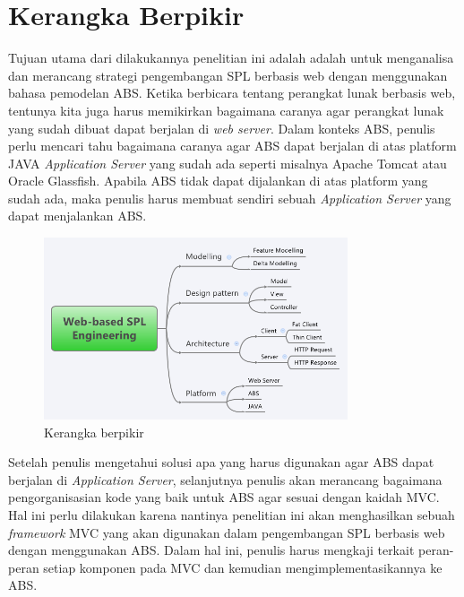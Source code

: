 \section{Kerangka Berpikir}
\noindent
Tujuan utama dari dilakukannya penelitian ini adalah adalah untuk menganalisa dan merancang strategi pengembangan SPL berbasis web dengan menggunakan bahasa pemodelan ABS. Ketika berbicara tentang perangkat lunak berbasis web, tentunya kita juga harus memikirkan bagaimana caranya agar perangkat lunak yang sudah dibuat dapat berjalan di \textit{web server}. Dalam konteks ABS, penulis perlu mencari tahu bagaimana caranya agar ABS dapat berjalan di atas platform JAVA \textit{Application Server} yang sudah ada seperti misalnya Apache Tomcat atau Oracle Glassfish. Apabila ABS tidak dapat dijalankan di atas platform yang sudah ada, maka penulis harus membuat sendiri sebuah \textit{Application Server} yang dapat menjalankan ABS.

\begin{figure}
    \centering
    \includegraphics[width=0.8\textwidth]
        {img/kerangka-berpikir.png}
    \caption{Kerangka berpikir}
\end{figure}

\noindent
Setelah penulis mengetahui solusi apa yang harus digunakan agar ABS dapat berjalan di \textit{Application Server}, selanjutnya penulis akan merancang bagaimana pengorganisasian kode yang baik untuk ABS agar sesuai dengan kaidah MVC. Hal ini perlu dilakukan karena nantinya penelitian ini akan menghasilkan sebuah \textit{framework} MVC yang akan digunakan dalam pengembangan SPL berbasis web dengan menggunakan ABS. Dalam hal ini, penulis harus mengkaji terkait peran-peran setiap komponen pada MVC dan kemudian mengimplementasikannya ke ABS. \\

